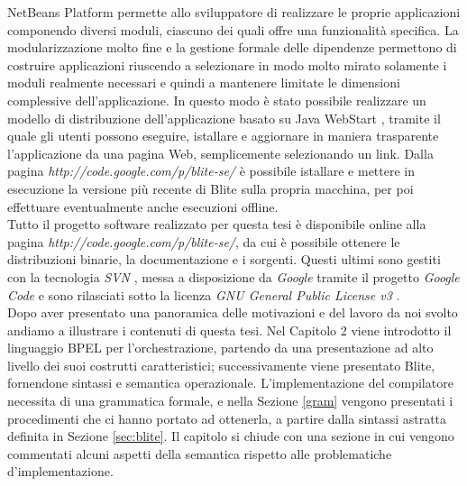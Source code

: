 NetBeans Platform permette allo sviluppatore di realizzare le proprie
applicazioni componendo diversi moduli, ciascuno dei quali offre una
funzionalità specifica. La modularizzazione molto fine e la gestione
formale delle dipendenze permettono di costruire applicazioni riuscendo a
selezionare in modo molto mirato solamente i moduli realmente necessari e
quindi a mantenere limitate le dimensioni complessive dell'applicazione. 
In questo modo è stato possibile realizzare un modello di distribuzione
dell'applicazione basato su Java WebStart \cite{JavaWS}, tramite il quale gli
utenti possono eseguire, istallare e aggiornare in maniera trasparente l'applicazione
da una pagina Web, semplicemente selezionando un link. Dalla pagina 
\emph{http://code.google.com/p/blite-se/} è possibile istallare e mettere in
esecuzione la versione più recente di Blite sulla propria macchina,
per poi effettuare eventualmente anche esecuzioni offline.
\\

Tutto il progetto software realizzato per questa tesi è disponibile online alla
pagina \emph{http://code.google.com/p/blite-se/}, da cui è possibile ottenere le
distribuzioni binarie, la documentazione e i sorgenti. Questi ultimi sono
gestiti con la tecnologia \emph{SVN} \cite{SVN}, messa a disposizione da
\emph{Google} tramite il progetto \emph{Google Code} \cite{GCode} e sono rilasciati
sotto la licenza \emph{GNU General Public License v3} \cite{GPLv3}.
\\

% 

Dopo aver presentato una panoramica delle motivazioni e del lavoro da noi svolto
andiamo a illustrare i contenuti di questa tesi. Nel Capitolo 2 viene introdotto
il linguaggio BPEL per l'orchestrazione, partendo da una presentazione ad alto
livello dei suoi costrutti caratteristici; successivamente viene presentato
Blite, fornendone sintassi e semantica operazionale.
L'implementazione del compilatore necessita di una grammatica formale, e nella
Sezione \ref{gram} vengono presentati i procedimenti che ci hanno portato ad
ottenerla, a partire dalla sintassi astratta definita in Sezione \ref{sec:blite}. Il
capitolo si chiude con una sezione in cui vengono commentati alcuni aspetti
della semantica rispetto alle problematiche d'implementazione.

